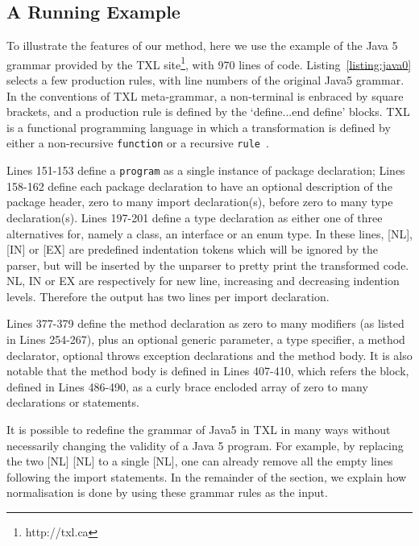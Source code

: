 \documentclass[10pt, conference, compsocconf]{IEEEtran}
\begin{document}
\subsection{A Running Example}\label{sec:example}
To illustrate the features of our method, here we use the example of the Java 5 grammar provided by the TXL site\footnote{http://txl.ca}, with 970 lines of code. Listing~\ref{listing:java0} selects a few production rules, with line numbers of the original Java5 grammar. In the conventions of TXL meta-grammar, a non-terminal is enbraced by square brackets, and a production rule is defined by the `define...end define' blocks. TXL is a functional programming language in which a transformation is defined by either a non-recursive {\tt function} or a recursive {\tt rule}~\cite{txl}.




Lines 151-153 define a {\tt program} as a single instance of package declaration; Lines 158-162 define each package declaration to have an optional description of the package header, zero to many import declaration(s), before zero to many type declaration(s). Lines 197-201 define a type declaration as either one of three alternatives for, namely a class, an interface or an enum type. In these lines, [NL], [IN] or [EX] are predefined indentation tokens which will be ignored by the parser, but will be inserted by the unparser to pretty print the transformed code.  NL, IN or EX are respectively for new line, increasing and decreasing indention levels. Therefore the output has two lines per import declaration. 

Lines 377-379 define the method declaration as zero to many modifiers (as listed in Lines 254-267), plus an optional generic parameter, a type specifier, a method declarator, optional throws exception declarations and the method body. 
It is also notable that the method body is defined in Lines 407-410, which refers the block, defined in Lines 486-490, as a curly brace encloded array of zero to many declarations or statements.

It is possible to redefine the grammar of Java5 in TXL in many ways without necessarily changing the validity of a Java 5 program. For example, by replacing the two [NL] [NL] to a single [NL], one can already remove all the empty lines following the import statements. In the remainder of the section, we explain how normalisation is done by using these grammar rules as the input.
\end{document}
